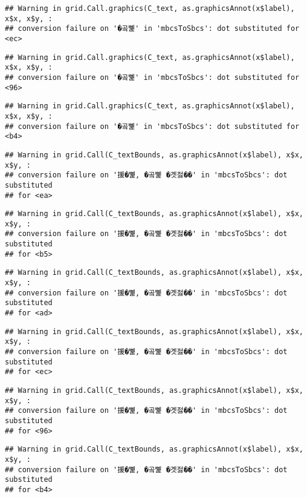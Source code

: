 \documentclass[
]{article}
\begin{document}
\begin{verbatim}
## Warning in grid.Call.graphics(C_text, as.graphicsAnnot(x$label), x$x, x$y, :
## conversion failure on '�곸뼱' in 'mbcsToSbcs': dot substituted for <ec>
\end{verbatim}

\begin{verbatim}
## Warning in grid.Call.graphics(C_text, as.graphicsAnnot(x$label), x$x, x$y, :
## conversion failure on '�곸뼱' in 'mbcsToSbcs': dot substituted for <96>
\end{verbatim}

\begin{verbatim}
## Warning in grid.Call.graphics(C_text, as.graphicsAnnot(x$label), x$x, x$y, :
## conversion failure on '�곸뼱' in 'mbcsToSbcs': dot substituted for <b4>
\end{verbatim}

\begin{verbatim}
## Warning in grid.Call(C_textBounds, as.graphicsAnnot(x$label), x$x, x$y, :
## conversion failure on '援�뼱, �곸뼱 �곗젏��' in 'mbcsToSbcs': dot substituted
## for <ea>
\end{verbatim}

\begin{verbatim}
## Warning in grid.Call(C_textBounds, as.graphicsAnnot(x$label), x$x, x$y, :
## conversion failure on '援�뼱, �곸뼱 �곗젏��' in 'mbcsToSbcs': dot substituted
## for <b5>
\end{verbatim}

\begin{verbatim}
## Warning in grid.Call(C_textBounds, as.graphicsAnnot(x$label), x$x, x$y, :
## conversion failure on '援�뼱, �곸뼱 �곗젏��' in 'mbcsToSbcs': dot substituted
## for <ad>
\end{verbatim}

\begin{verbatim}
## Warning in grid.Call(C_textBounds, as.graphicsAnnot(x$label), x$x, x$y, :
## conversion failure on '援�뼱, �곸뼱 �곗젏��' in 'mbcsToSbcs': dot substituted
## for <ec>
\end{verbatim}

\begin{verbatim}
## Warning in grid.Call(C_textBounds, as.graphicsAnnot(x$label), x$x, x$y, :
## conversion failure on '援�뼱, �곸뼱 �곗젏��' in 'mbcsToSbcs': dot substituted
## for <96>
\end{verbatim}

\begin{verbatim}
## Warning in grid.Call(C_textBounds, as.graphicsAnnot(x$label), x$x, x$y, :
## conversion failure on '援�뼱, �곸뼱 �곗젏��' in 'mbcsToSbcs': dot substituted
## for <b4>
\end{verbatim}
\end{document}
